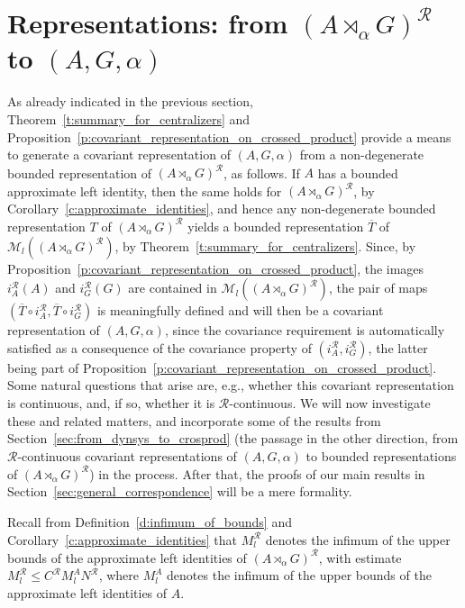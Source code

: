 \documentclass{amsart}
\theoremstyle{plain}
\theoremstyle{definition}
\numberwithin{equation}{section}
\begin{document}
\section{Representations: from ${(A {\rtimes}_\alpha G)^\mathcal{R}}$ to ${(A,G,\alpha)}$}\label{sec:from_crosprod_to_dynsys}

As already indicated in the previous section, Theorem~\ref{t:summary_for_centralizers} and  Proposition~\ref{p:covariant_representation_on_crossed_product} provide a means to generate a covariant representation of ${(A,G,\alpha)}$ from a non-degenerate bounded representation of ${(A {\rtimes}_\alpha G)^\mathcal{R}}$, as follows. If $A$ has a bounded approximate left identity, then the same holds for ${(A {\rtimes}_\alpha G)^\mathcal{R}}$, by Corollary~\ref{c:approximate_identities}, and hence any non-degenerate bounded representation $T$ of ${(A {\rtimes}_\alpha G)^\mathcal{R}}$ yields a bounded representation $\overline T$ of $\mathcal M_l({(A {\rtimes}_\alpha G)^\mathcal{R}})$, by Theorem~\ref{t:summary_for_centralizers}. Since, by Proposition~\ref{p:covariant_representation_on_crossed_product}, the images $i_A^{\mathcal R}(A)$ and $i_G^{\mathcal R}(G)$ are contained in $\mathcal M_l({(A {\rtimes}_\alpha G)^\mathcal{R}})$, the pair of maps $(\overline T\circ i_A^{\mathcal R}, \overline T\circ i_G^{\mathcal R})$ is meaningfully defined and will then be a covariant representation of ${(A,G,\alpha)}$, since the covariance requirement is automatically satisfied as a consequence of the covariance property of $(i_A^{\mathcal R}, i_G^{\mathcal R})$, the latter being part of Proposition~\ref{p:covariant_representation_on_crossed_product}. Some natural questions that arise are, e.g., whether this covariant representation is continuous, and, if so, whether it is ${\mathcal R}$-continuous. We will now investigate these and related matters, and incorporate some of the results from Section~\ref{sec:from_dynsys_to_crosprod} (the passage in the other direction, from ${\mathcal R}$-continuous covariant representations of ${(A,G,\alpha)}$ to bounded representations of ${(A {\rtimes}_\alpha G)^\mathcal{R}}$) in the process. After that, the proofs of our main results in Section~\ref{sec:general_correspondence} will be a mere formality.

Recall from Definition~\ref{d:infimum_of_bounds} and Corollary~\ref{c:approximate_identities} that $M_l^{\mathcal R}$ denotes the infimum of the upper bounds of the approximate left identities of ${(A {\rtimes}_\alpha G)^\mathcal{R}}$, with estimate $M_l^{\mathcal R} \leq {{C^{\mathcal R}}} M_l^A N^{\mathcal R}$, where $M_l^A$ denotes the infimum of the upper bounds of the approximate left identities of $A$.
\end{document}

